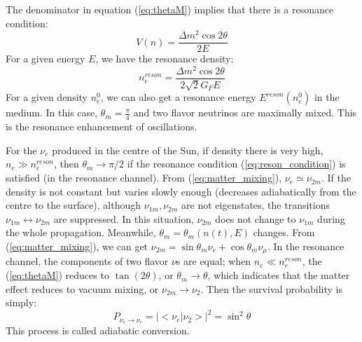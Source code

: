\documentclass[preprint,12pt]{elsarticle}
\numberwithin{equation}{section}
\begin{document}
The denominator in equation (\ref{eq:thetaM}) implies that there is a resonance condition:
\begin{equation}\label{eq:reson_condition}
V(n)=\frac{\Delta m^2\cos2\theta}{2E}
\end{equation}
For a given energy $E$, we have the resonance density:
\begin{equation}
n^{reson}_{e}=\frac{\Delta m^2\cos2\theta}{2\sqrt2G_FE}
\end{equation}
For a given density $n^0_e$, we can also get a resonance energy $E^{reson}(n^0_e)$ in the medium.
In this case, $\theta_m = \frac{\pi}{4}$ and two flavor neutrinos are maximally mixed. This is the resonance enhancement of oscillations\cite{smirnov,japan_text}.

For the $\nu_e$ produced in the centre of the Sun, if density there is very high, $n_e\gg n^{reson}_e$, then $\theta_m\to\pi/2$ if the resonance condition (\ref{eq:reson_condition}) is satisfied (in the resonance channel). From (\ref{eq:matter_mixing}), $\nu_e\simeq\nu_{2m}$.
If the density is not constant but varies slowly enough (decreases adiabatically from the centre to the surface), although $\nu_{1m},\nu_{2m}$ are not eigenstates, the transitions $\nu_{1m}\leftrightarrow \nu_{2m}$ are suppressed. In this situation, $\nu_{2m}$ does not change to $\nu_{1m}$ during the whole propagation. Meanwhile, $\theta_m=\theta_m(n(t),E)$ changes. From (\ref{eq:matter_mixing}), we can get $\nu_{2m} = \sin\theta_m\nu_e+\cos\theta_m\nu_\mu$. In the resonance channel, the components of two flavor $\nu$s are equal; when $n_e\ll n^{reson}_e$, the (\ref{eq:thetaM}) reduces to $\tan(2\theta)$, or $\theta_m\to\theta$, which indicates that the matter effect reduces to vacuum mixing, or $\nu_{2m}\to\nu_2$. Then the survival probability is simply: 
\begin{equation}\label{eq:adiabatic}
P_{\nu_e\to\nu_e}=|<\nu_e|\nu_2>|^2=\sin^2\theta
\end{equation}
This process is called adiabatic conversion\cite{smirnov}. 
\end{document}
